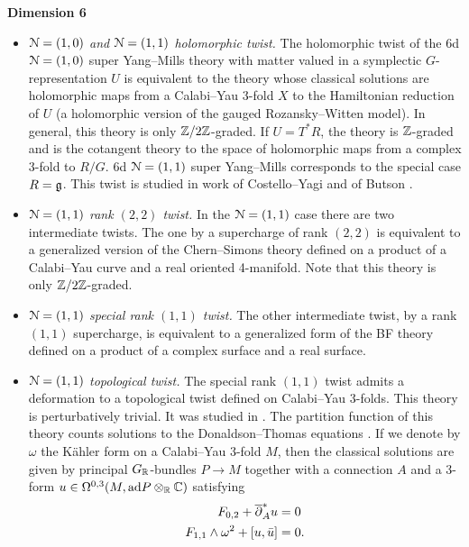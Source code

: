 \documentclass[10pt, oneside]{article}
\begin{document}
\textbf{Dimension 6}
\begin{itemize}
 \item \emph{$\mathcal{N}=(1,0)$ and $\mathcal{N}=(1,1)$ holomorphic twist.} The holomorphic twist of the 6d $\mathcal N=(1, 0)$ super Yang--Mills theory with matter valued in a symplectic $G$-representation $U$ is equivalent to the theory whose classical solutions are holomorphic maps from a Calabi--Yau 3-fold $X$ to the Hamiltonian reduction of $U$ (a holomorphic version of the gauged Rozansky--Witten model). In general, this theory is only $\mathbb Z/2\mathbb Z$-graded. If $U=T^*R$, the theory is $\mathbb Z$-graded and is the cotangent theory to the space of holomorphic maps from a complex 3-fold to $R/G$. 6d $\mathcal N=(1, 1)$ super Yang--Mills corresponds to the special case $R=\mathfrak g$. This twist is studied in work of Costello--Yagi and of Butson \cite{CostelloYagi,Butson}.
 \item \emph{$\mathcal{N}=(1,1)$ rank $(2, 2)$ twist.} In the $\mathcal{N}=(1,1)$ case there are two intermediate twists. The one by a supercharge of rank $(2, 2)$ is equivalent to a generalized version of the Chern--Simons theory defined on a product of a Calabi--Yau curve and a real oriented 4-manifold. Note that this theory is only $\mathbb Z/2\mathbb Z$-graded.
 \item \emph{$\mathcal{N}=(1,1)$ special rank $(1,1)$ twist.} The other intermediate twist, by a rank $(1, 1)$ supercharge, is equivalent to a generalized form of the BF theory defined on a product of a complex surface and a real surface.
 \item \emph{$\mathcal{N}=(1,1)$ topological twist.} The special rank $(1, 1)$ twist admits a deformation to a topological twist defined on Calabi--Yau 3-folds. This theory is perturbatively trivial. It was studied in \cite{AcharyaOLoughlinSpence, BaulieuKannoSinger}. The partition function of this theory counts solutions to the Donaldson--Thomas equations \cite{Thomas}. If we denote by $\omega$ the K\"ahler form on a Calabi--Yau 3-fold $M$, then the classical solutions are given by principal $G_\mathbb R$-bundles $P\rightarrow M$ together with a connection $A$ and a 3-form $u\in\Omega^{0, 3}(M, \mathrm{ad} P\otimes_\mathbb R \mathbb C)$ satisfying
\begin{align}
F_{0, 2} + \overline{\partial}^*_A u &= 0 \\
F_{1, 1}\wedge \omega^2 + [u, \bar{u}] &= 0.
\end{align}
\end{itemize}
\end{document}
